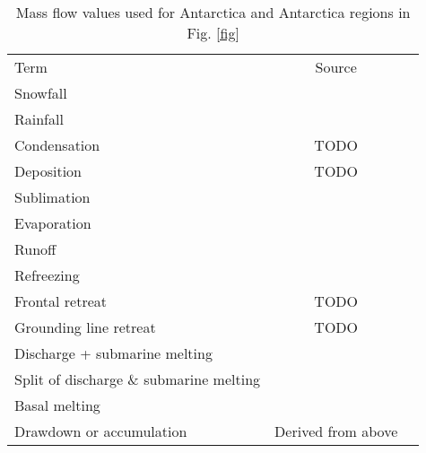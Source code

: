 \documentclass[jog]{igs}
\begin{document}
\begin{table*}
\caption{Mass flow values used for Antarctica and Antarctica regions in Fig. \ref{fig}}
\label{tab:aq}
\begin{tabular}{@{}lcc}\hline
  Term & Source\\
  Snowfall & \citet{fettweis_2020}\\
  Rainfall & \citet{fettweis_2020}\\
  Condensation & TODO\\
  Deposition & TODO\\
  Sublimation & \citet{fettweis_2020}\\
  Evaporation & \citet{fettweis_2020}\\
  Runoff & \citet{fettweis_2020}\\
  Refreezing & \citet{fettweis_2020}\\
  Frontal retreat & TODO\\
  Grounding line retreat & TODO\\
  Discharge + submarine melting & \citet{davison_2023}\\
  Split of discharge \& submarine melting & \citet{davison_2023}\\
  Basal melting & \citet{van-liefferinge_2013}\\
  Drawdown or accumulation & Derived from above
\end{tabular}
\end{table*}
\end{document}
